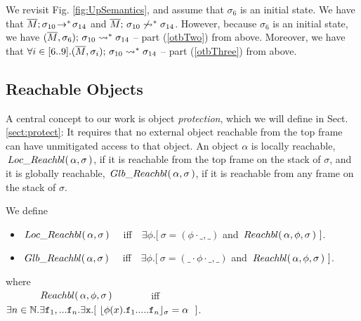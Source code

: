 {We revisit  Fig. \ref{fig:UpSemantics}, and assume that $\sigma_6$ is an initial state.
We have that $\leadstoOrigStar {\Mtwo} {\sigma_{10}}  {\sigma_{14}}$ and $ \notLeadstoBoundedStar {\Mtwo}  {\sigma_{10}} {\sigma_{14}}$.
However, because $\sigma_6$ is an initial state, we have $\leadstoBoundedStarThree {\Mtwo}  {\sigma_{10}} {\sigma_{6}}  {\sigma_{14}}$ -- part (\ref{otbTwo}) 
from above. 
Moreover, we have that  $\forall i\in [6..9].\leadstoBoundedStarThree {\Mtwo}  {\sigma_{10}} {\sigma_{i}}  {\sigma_{14}}$ -- part (\ref{otbThree}) 
from above. 
}

  \subsection{{Reachable  Objects}}

 {A central concept to our work is object \emph{protection}, which we will define in   Sect. \ref{sect:protect}: It requires that no external object  
reachable from the top frame  can have unmitigated access to that object.}
%
%
An object $\alpha$ is  locally reachable, $ \LRelevant \alpha \sigma $, if it is reachable from the top frame on the stack of $\sigma$,
and it is globally reachable, $\GRelevant \alpha \sigma$, if it is reachable from any  frame on the stack of $\sigma$.
 
\begin{definition} We define 
\begin{itemize}
\item
$ \LRelevant \alpha \sigma $ \ \ iff\ \  
$\exists \phi.[\ \sigma=(\phi\cdot\_, \_)$ and $\Relevant \alpha \phi \sigma\ ]$. %
\item
$\GRelevant \alpha \sigma$  \ \ iff\ \  
$\exists \phi.[\ \sigma=(\_\cdot\phi\cdot\_, \_)$ and $\Relevant \alpha \phi \sigma\ ]$. %
\end{itemize}
where\\
$\strut\ \ \ \  \ \ \ \ \ \ \Relevant \alpha \phi \sigma $  \ \ \ \ \ \ \ iff\ \  
$\exists n\in \mathbb{N}.\exists \prg{f}_1,... \prg{f}_n.\exists \prg{x}.[ \ \interpret{\sigma}{\phi(x).\prg{f}_1.....\prg{f}_n} = \alpha \ \ ]$.

\end{definition}

